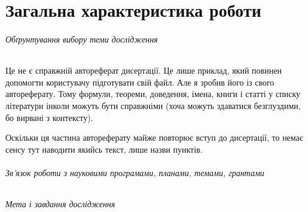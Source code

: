 \documentclass[
]{mon2017dev-aref}[2021/07/21]
\theoremstyle{plain}
\theoremstyle{definition}
\theoremstyle{remark}
\begin{document}

\maketitle


\part{Загальна характеристика роботи}

\paragraph{Обґрунтування вибору теми дослідження}

Це не є справжній автореферат дисертації. Це лише приклад, який
повинен допомогти користувачу підготувати свій файл. Але я зробив
його із свого автореферату. Тому формули, теореми, доведення,
імена, книги і статті у списку літератури інколи можуть бути
справжніми (хоча можуть здаватися безглуздими, бо вирвані з
контексту).

Оскільки ця частина автореферату майже повторює вступ до
дисертації, то немає сенсу тут наводити якийсь текст, лише назви
пунктів.

\paragraph{Зв'язок роботи з науковими програмами, планами, темами, грантами}

\paragraph{Мета і завдання дослідження}
\end{document}
